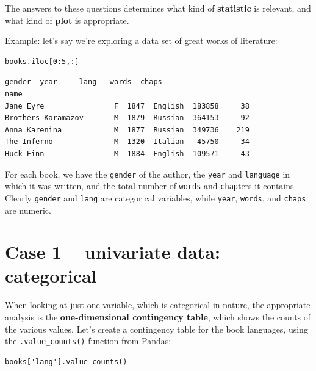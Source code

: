 The answers to these questions determines what kind of \textbf{statistic} is
relevant, and what kind of \textbf{plot} is appropriate.

\pagebreak
Example: let's say we're exploring a data set of great works of literature:


\begin{Verbatim}[fontsize=\small,samepage=true,frame=single,framesep=3mm]
books.iloc[0:5,:]
\end{Verbatim}
\vspace{-.2in}

\begin{Verbatim}[fontsize=\small,samepage=true,frame=leftline,framesep=5mm,framerule=1mm]
                    gender  year     lang   words  chaps
name
Jane Eyre                F  1847  English  183858     38
Brothers Karamazov       M  1879  Russian  364153     92
Anna Karenina            M  1877  Russian  349736    219
The Inferno              M  1320  Italian   45750     34
Huck Finn                M  1884  English  109571     43
\end{Verbatim}

For each book, we have the \texttt{gender} of the author, the \texttt{year} and
\texttt{language} in which it was written, and the total number of
\texttt{words} and \texttt{chap}ters it contains. Clearly \texttt{gender} and
\texttt{lang} are categorical variables, while \texttt{year}, \texttt{words},
and \texttt{chaps} are numeric.

\section{Case 1 -- univariate data: categorical}
\label{contingencyTable}


When looking at just one variable, which is categorical in nature, the
appropriate analysis is the \textbf{one-dimensional contingency table}, which
shows the counts of the various values. Let's create a contingency table for
the book languages, using the \texttt{.value\_counts()} function from Pandas:

\begin{Verbatim}[fontsize=\small,samepage=true,frame=single,framesep=3mm]
books['lang'].value_counts()
\end{Verbatim}
\vspace{-.2in}


